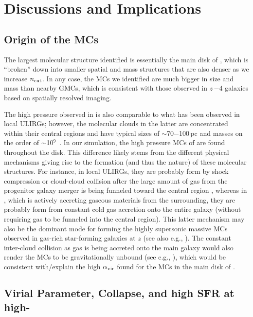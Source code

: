 \documentclass[iop]{emulateapj}
\begin{document}
\section{Discussions and Implications}     \label{sec:diss}

\subsection{Origin of the MCs} \label{sec:origin}
The largest molecular structure identified is essentially the main disk of \flower, which is ``broken'' down into smaller
spatial and mass structures that are also denser as we increase $n_{\rm cut}$. In any case,
the MCs we identified are much bigger in size and mass than nearby GMCs, which is consistent with
those observed in $z$\,$-$4 galaxies based on spatially resolved imaging.

The high pressure observed in \flower is also comparable to what has been observed in local ULIRGs; however, the 
molecular clouds in the latter are concentrated within their central regions and have typical sizes of $\sim$70$-$100\,pc and masses on the order of $\sim$10$^9$\,\Msun
\citep{Downes98a, Sakamoto08a}. In our simulation, the high pressure MCs of \flower are 
found throughout the disk. This difference likely stems from the different physical mechanisms giving rise 
to the formation (and thus the nature) of these molecular structures. 
For instance, in local ULIRGs, they are probably form by shock compression or cloud-cloud 
collision after the large amount of gas from the progenitor galaxy merger 
is being funneled toward the central region \citep{Tan00a, Wu18a},  %
whereas in \flower, which is actively accreting gaseous materials 
from the surrounding, they are probably form from constant cold gas accretion onto the entire galaxy (without 
requiring gas to be funneled into the central region).
This latter mechanism may also be the dominant mode for forming the highly supersonic massive MCs observed 
in gas-rich star-forming galaxies at $z$ (see also e.g., \citealt{}).
The constant inter-cloud collision as gas is being accreted onto the main galaxy would also render 
the MCs to be gravitationally unbound (see e.g., \citealt{Dobbs11a}), which would be consistent with/explain the 
high $\alpha_{\rm vir}$ found for the MCs in the main disk of \flower.


\subsection{Virial Parameter, Collapse, and high SFR at high-\z}
\end{document}
